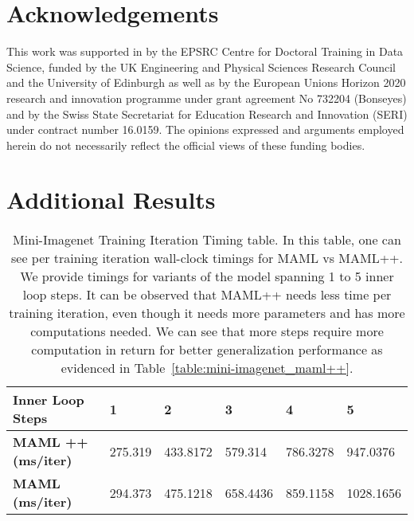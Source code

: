 \documentclass{article} \usepackage[dvipsnames]{xcolor}
\begin{document}
\section{Acknowledgements}
This work was supported in by the EPSRC Centre for Doctoral Training in Data Science, funded by the UK Engineering and Physical
Sciences Research Council and the University of Edinburgh as well as by the European Unions Horizon 2020 research and innovation programme under grant agreement No 732204 (Bonseyes) and by the Swiss State Secretariat for Education Research and Innovation (SERI) under contract number 16.0159. The opinions expressed and arguments employed herein do not necessarily reflect the official views of these funding bodies.






\appendix


\section{Additional Results}

\begin{table}[tbh]
\centering
\caption{Mini-Imagenet Training Iteration Timing table. In this table, one can see per training iteration wall-clock timings for MAML vs MAML++. We provide timings for variants of the model spanning 1 to 5 inner loop steps. It can be observed that MAML++ needs less time per training iteration, even though it needs more parameters and has more computations needed. We can see that more steps require more computation in return for better generalization performance as evidenced in Table~\ref{table:mini-imagenet_maml++}.
	\label{table:mini-imagenet_timings}}
	
\begin{tabular}{|l|l|l|l|l|l|}
\hline
\textbf{Inner Loop Steps}  & \textbf{1} & \textbf{2} & \textbf{3} & \textbf{4} & \textbf{5} \\ \hline
\textbf{MAML ++ (ms/iter)} & 275.319    & 433.8172   & 579.314    & 786.3278   & 947.0376   \\ \hline
\textbf{MAML (ms/iter)}    & 294.373    & 475.1218   & 658.4436   & 859.1158   & 1028.1656  \\ \hline
\end{tabular}
\end{table}
\end{document}

